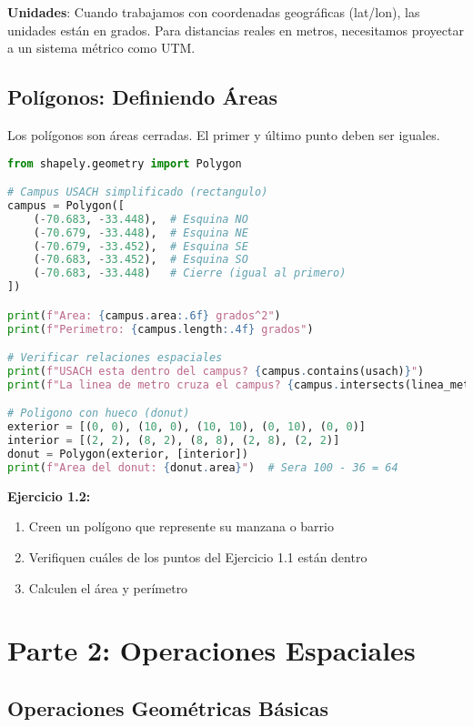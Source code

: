 \documentclass[11pt,a4paper]{article}
\newcommand{\importante}[1]{\begin{tcolorbox}[colback=yellow!10,colframe=orange,title={Importante}]#1\end{tcolorbox}}
\newcommand{\ejercicio}[1]{\begin{tcolorbox}[colback=red!5,colframe=red,title={Ejercicio}]#1\end{tcolorbox}}
\begin{document}
\importante{
\textbf{Unidades}: Cuando trabajamos con coordenadas geográficas (lat/lon), las unidades están en grados. Para distancias reales en metros, necesitamos proyectar a un sistema métrico como UTM.
}

\subsection{Polígonos: Definiendo Áreas}

Los polígonos son áreas cerradas. El primer y último punto deben ser iguales.

\begin{lstlisting}[language=Python]
from shapely.geometry import Polygon

# Campus USACH simplificado (rectangulo)
campus = Polygon([
    (-70.683, -33.448),  # Esquina NO
    (-70.679, -33.448),  # Esquina NE
    (-70.679, -33.452),  # Esquina SE
    (-70.683, -33.452),  # Esquina SO
    (-70.683, -33.448)   # Cierre (igual al primero)
])

print(f"Area: {campus.area:.6f} grados^2")
print(f"Perimetro: {campus.length:.4f} grados")

# Verificar relaciones espaciales
print(f"USACH esta dentro del campus? {campus.contains(usach)}")
print(f"La linea de metro cruza el campus? {campus.intersects(linea_metro)}")

# Poligono con hueco (donut)
exterior = [(0, 0), (10, 0), (10, 10), (0, 10), (0, 0)]
interior = [(2, 2), (8, 2), (8, 8), (2, 8), (2, 2)]
donut = Polygon(exterior, [interior])
print(f"Area del donut: {donut.area}")  # Sera 100 - 36 = 64
\end{lstlisting}

\ejercicio{
\textbf{Ejercicio 1.2:} 
\begin{enumerate}
    \item Creen un polígono que represente su manzana o barrio
    \item Verifiquen cuáles de los puntos del Ejercicio 1.1 están dentro
    \item Calculen el área y perímetro
\end{enumerate}
}

\newpage

\section{Parte 2: Operaciones Espaciales}

\subsection{Operaciones Geométricas Básicas}
\end{document}
